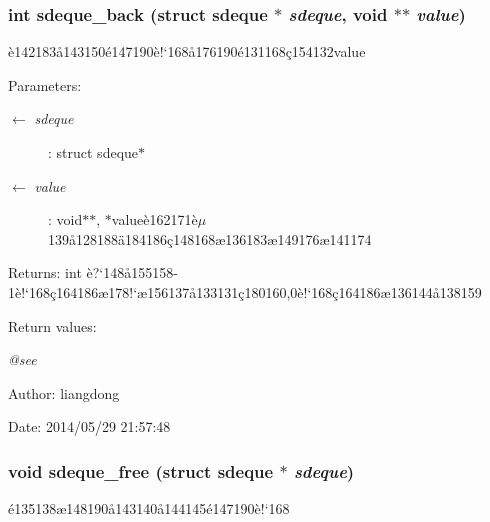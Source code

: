 \subsubsection{\setlength{\rightskip}{0pt plus 5cm}int sdeque\_\-back (struct sdeque $\ast$ {\em sdeque}, void $\ast$$\ast$ {\em value})}\label{sdeque_8c_a7}


\`{e}142183\aa{}143150\'{e}147190\`{e}!`168\aa{}176190\'{e}131168\c{c}154132value 

\begin{Desc}
\item[Parameters:]
\begin{description}
\item[\mbox{$\leftarrow$} {\em sdeque}]: struct sdeque$\ast$ \item[\mbox{$\leftarrow$} {\em value}]: void$\ast$$\ast$, $\ast$value\`{e}162171\`{e}$\mu$139\aa{}128188\"{a}184186\c{c}148168\ae{}136183\ae{}149176\ae{}141174 \end{description}
\end{Desc}
\begin{Desc}
\item[Returns:]int \`{e}?`148\aa{}155158-1\`{e}!`168\c{c}164186\ae{}178!`\ae{}156137\aa{}133131\c{c}180160,0\`{e}!`168\c{c}164186\ae{}136144\aa{}138159 \end{Desc}
\begin{Desc}
\item[Return values:]
\begin{description}
\item[{\em @see}]\end{description}
\end{Desc}
\begin{Desc}
\item[Author:]liangdong \end{Desc}
\begin{Desc}
\item[Date:]2014/05/29 21:57:48 \end{Desc}
\subsubsection{\setlength{\rightskip}{0pt plus 5cm}void sdeque\_\-free (struct sdeque $\ast$ {\em sdeque})}\label{sdeque_8c_a1}


\'{e}135138\ae{}148190\aa{}143140\aa{}144145\'{e}147190\`{e}!`168 

